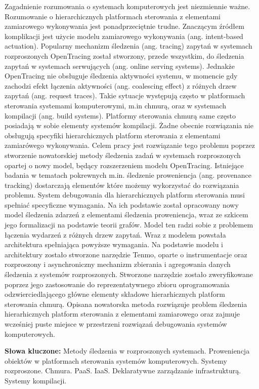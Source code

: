 Zagadnienie rozumowania o systemach komputerowych jest niezmiennie ważne. Rozumowanie o hierarchicznych platformach sterowania z elementami zamiarowego wykonywania jest ponadprzeciętnie trudne. Znaczącym źródłem komplikacji jest użycie modelu zamiarowego wykonywania (ang. intent-based actuation). Popularny mechanizm śledzenia (ang. tracing) zapytań w systemach rozproszonych OpenTracing został stworzony, przede wszystkim, do śledzenia zapytań w systemach serwujących (ang. online serving systems). Jednakże OpenTracing nie obsługuje śledzenia aktywności systemu, w momencie gdy zachodzi efekt łączenia aktywności (ang. coalescing effect) z różnych drzew zapytań (ang. request traces). Takie sytuacje występują często w platformach sterowania systemami komputerowymi, m.in chmurą, oraz w systemach kompilacji (ang. build systems). Platformy sterowania chmurą same często posiadają w sobie elementy systemów kompilacji. Żadne obecnie rozwiązania nie obsługują specyfiki hierarchicznych platform sterowania z elementami zamiarówego wykonywania.  Celem pracy jest rozwiązanie tego problemu poprzez stworzenie nowatorskiej metody śledzenia zadań w systemach rozproszonych opartej o nowy model, będący rozszerzeniem modelu OpenTracing. Istniejące badania w tematach pokrewnych m.in. śledzenie proweniencja (ang. provenance tracking) dostarczają elementów które możemy wykorzystać do rozwiązania problemu. System debugowania dla hierarchicznych platform sterowania musi spełniać specyficzne wymagania. Na ich podstawie został opracowany nowy model śledzenia zdarzeń z elementami śledzenia proweniencja, wraz ze szkicem jego formalizacji na podstawie teorii grafów. Model ten radzi sobie z problemem łączenia wydarzeń z różnych drzew zapytań. Wraz z modelem powstała architektura spełniająca powyższe wymagania. Na podstawie modelu i architektury zostało stworzone narzędzie Tenmo, oparte o instrumentacje oraz rozproszony i asynchroniczny mechanizm zbierania i agregowania danych śledzenia z systemów rozproszonych. Stworzone narzędzie zostało zweryfikowane poprzez jego zastosowanie do reprezentatywnego zbioru oprogramowania odzwierciedlającego główne elementy składowe hierarhicznych platform sterowania chmurą. Opisana nowatorska metoda rozwiązuje problem śledzenia hierarhicznych platform sterowania z elementami zamiarowego oraz zajmuje wcześniej puste miejsce w przestrzeni rozwiązań debugowania systemów komputerowych.

\noindent \textbf{Słowa kluczone:} Metody śledzenia w rozproszonych systemach. Proweniencja obiektów w platformach sterowania systemów komputerowych. Systemy rozproszone. Chmura. PaaS. IaaS. Deklaratywne zarządzanie infrastrukturą. Systemy kompilacji.
